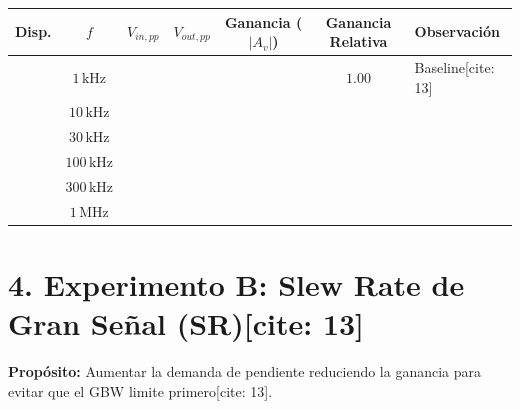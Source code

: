 \documentclass[11pt, a4paper]{article}
\begin{document}
\begin{table}[h!]
    \centering
    \footnotesize
    \renewcommand{\arraystretch}{1.3}
    \begin{tabularx}{\textwidth}{|c|c|c|c|c|c|>{\raggedright\arraybackslash}X|}
    \hline
    \textbf{Disp.} & \textbf{$f$} & \textbf{$V_{in,pp}$} & \textbf{$V_{out,pp}$} & \textbf{Ganancia ($|A_v|$)} & \textbf{Ganancia Relativa} & \textbf{Observación} \\ \hline
    & $1\,\text{kHz}$ & & & & $1.00$ & Baseline[cite: 13] \\ \hline
    & $10\,\text{kHz}$ & & & & & \\ \hline
    & $30\,\text{kHz}$ & & & & & \\ \hline
    & $100\,\text{kHz}$ & & & & & \\ \hline
    & $300\,\text{kHz}$ & & & & & \\ \hline
    & $1\,\text{MHz}$ & & & & & \\ \hline
    \end{tabularx}
\end{table}

\section*{4. Experimento B: Slew Rate de Gran Señal (SR)[cite: 13]}
\textbf{Propósito:} Aumentar la demanda de pendiente reduciendo la ganancia para evitar que el GBW limite primero[cite: 13].
\end{document}
